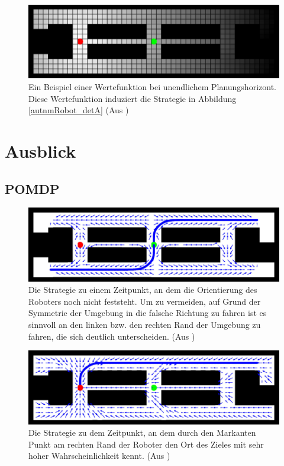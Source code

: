 \documentclass[a4paper]{IEEEtran}
\begin{document}
\begin{figure}[ht]
	\centering
	\includegraphics[scale=0.72]{images/autnmRobot_MDPValueFunction.png}
	\caption{Ein Beispiel einer Wertefunktion bei unendlichem Planungshorizont. Diese Wertefunktion induziert die Strategie in Abbildung \ref{autnmRobot_detA} (Aus \cite{thrun2005probabilistic})}
	\label{autnmRobot_policy}
\end{figure}

\section{Ausblick}
\subsection{POMDP}
\begin{figure}[ht]
	\centering
	\includegraphics[scale=0.72]{images/autnmRobot_POMDPPathA.png}
	\caption{Die Strategie zu einem Zeitpunkt, an dem die Orientierung des Roboters noch nicht feststeht. Um zu vermeiden, auf Grund der Symmetrie der Umgebung in die falsche Richtung zu fahren ist es sinnvoll an den linken bzw. den rechten Rand der Umgebung zu fahren, die sich deutlich unterscheiden. (Aus \cite{thrun2005probabilistic})}
	\label{autnmRobot_POMDPPathA}
\end{figure}

\begin{figure}[ht]
	\centering
	\includegraphics[scale=0.72]{images/autnmRobot_POMDPPathB.png}
	\caption{Die Strategie zu dem Zeitpunkt, an dem durch den Markanten Punkt am rechten Rand der Roboter den Ort des Zieles mit sehr hoher Wahrscheinlichkeit kennt. (Aus \cite{thrun2005probabilistic})}
	\label{autnmRobot_POMDPPathB}
\end{figure}
\end{document}
